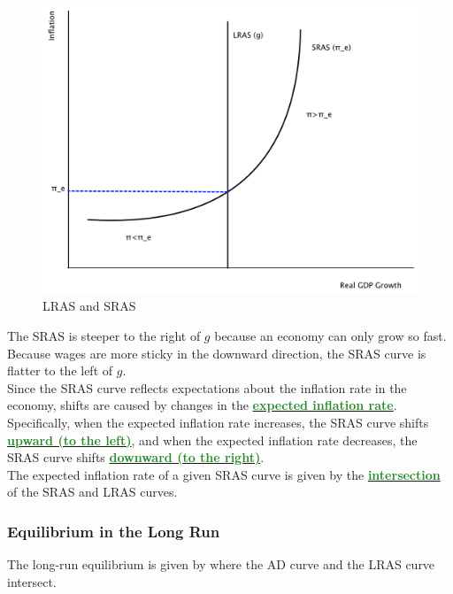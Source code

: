 \documentclass[11pt]{article}\usepackage[]{graphicx}\usepackage[]{color}
\theoremstyle{definition}
\newcommand{\dd}[1]{{\underline{\textbf{\textcolor{ForestGreen}{#1}}}}}
\begin{document}
\begin{figure}[H]
	\centering
	\includegraphics[scale=.40]{plot97.pdf}
	\caption{LRAS and SRAS}
\end{figure}


The SRAS is steeper to the right of $g$ because an economy can only grow so fast. Because wages are more sticky in the downward direction, the SRAS curve is flatter to the left of $g$.
\\

Since the SRAS curve reflects expectations about the inflation rate in the economy, shifts are caused by changes in the \dd{expected inflation rate}.
\\

Specifically, when the expected inflation rate increases, the SRAS curve shifts \dd{upward (to the left)}, and when the expected inflation rate decreases, the SRAS curve shifts \dd{downward (to the right)}.
\\

The expected inflation rate of a given SRAS curve is given by the \dd{intersection} of the SRAS and LRAS curves.

\subsubsection*{Equilibrium in the Long Run}

The long-run equilibrium is given by where the AD curve and the LRAS curve intersect. 
\end{document}
